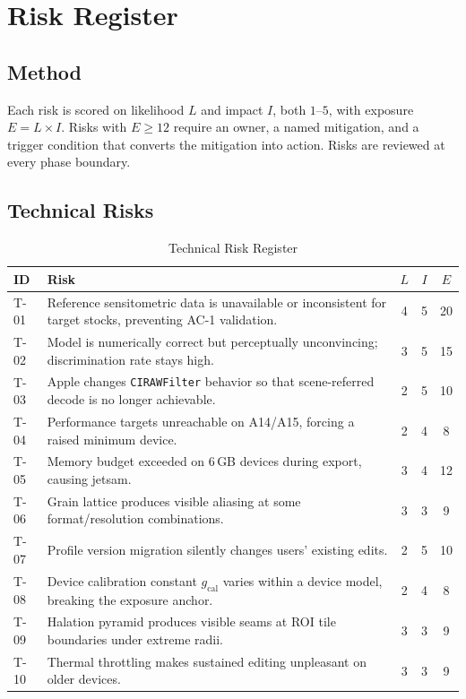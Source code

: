 \section{Risk Register}
\label{sec:risks}

\subsection{Method}

Each risk is scored on likelihood $L$ and impact $I$, both $1$--$5$, with
exposure $E = L \times I$. Risks with $E \geq 12$ require an owner, a named
mitigation, and a trigger condition that converts the mitigation into action.
Risks are reviewed at every phase boundary.

\subsection{Technical Risks}

\begin{table}[htbp]
\caption{Technical Risk Register}
\label{tab:techrisk}
\begin{center}
\renewcommand{\arraystretch}{1.15}
\begin{tabularx}{\columnwidth}{@{}l>{\raggedright\arraybackslash}Xccc@{}}
\toprule
\textbf{ID} & \textbf{Risk} & $L$ & $I$ & $E$ \\
\midrule
T-01 & Reference sensitometric data is unavailable or inconsistent for target stocks, preventing AC-1 validation. & 4 & 5 & 20 \\
T-02 & Model is numerically correct but perceptually unconvincing; discrimination rate stays high. & 3 & 5 & 15 \\
T-03 & Apple changes \texttt{CIRAWFilter} behavior so that scene-referred decode is no longer achievable. & 2 & 5 & 10 \\
T-04 & Performance targets unreachable on A14/A15, forcing a raised minimum device. & 2 & 4 & 8 \\
T-05 & Memory budget exceeded on 6\,GB devices during export, causing jetsam. & 3 & 4 & 12 \\
T-06 & Grain lattice produces visible aliasing at some format/resolution combinations. & 3 & 3 & 9 \\
T-07 & Profile version migration silently changes users' existing edits. & 2 & 5 & 10 \\
T-08 & Device calibration constant $g_{\mathrm{cal}}$ varies within a device model, breaking the exposure anchor. & 2 & 4 & 8 \\
T-09 & Halation pyramid produces visible seams at ROI tile boundaries under extreme radii. & 3 & 3 & 9 \\
T-10 & Thermal throttling makes sustained editing unpleasant on older devices. & 3 & 3 & 9 \\
\bottomrule
\end{tabularx}
\end{center}
\end{table}

